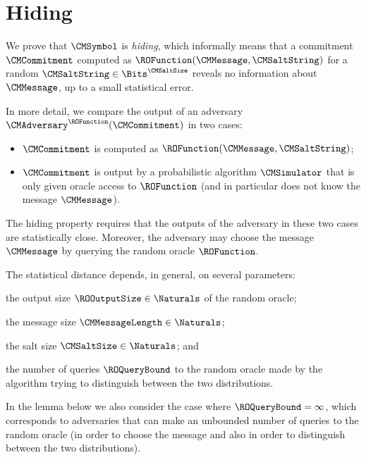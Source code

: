 \section{Hiding}
\label{section:basic-commitment-hiding}

We prove that $\CMSymbol$ is \emph{hiding}, which informally means that a commitment $\CMCommitment$ computed as $\ROFunction(\CMMessage,\CMSaltString)$ for a random $\CMSaltString \in \Bits^{\CMSaltSize}$ reveals no information about $\CMMessage$, up to a small statistical  error.

In more detail, we compare the output of an adversary $\CMAdversary^{\ROFunction}(\CMCommitment)$ in two cases:
\begin{itemize}[noitemsep]
  \item $\CMCommitment$ is computed as $\ROFunction(\CMMessage,\CMSaltString)$;
  \item $\CMCommitment$ is output by a probabilistic algorithm $\CMSimulator$ that is only given oracle access to $\ROFunction$ (and in particular does not know the message $\CMMessage$).
\end{itemize}
The hiding property requires that the outputs of the adversary in these two cases are statistically close. Moreover, the adversary may choose the message $\CMMessage$ by querying the random oracle $\ROFunction$.

The statistical distance depends, in general, on several parameters:
\begin{inparaenum}[(a)]
  \item the output size $\ROOutputSize \in \Naturals$ of the random oracle;
  \item the message size $\CMMessageLength \in \Naturals$;
  \item the salt size $\CMSaltSize \in \Naturals$; and
  \item the number of queries $\ROQueryBound$ to the random oracle made by the algorithm trying to distinguish between the two distributions.
\end{inparaenum}
In the lemma below we also consider the case where $\ROQueryBound=\infty$, which corresponds to adversaries that can make an unbounded number of queries to the random oracle (in order to choose the message and also in order to distinguish between the two distributions).

